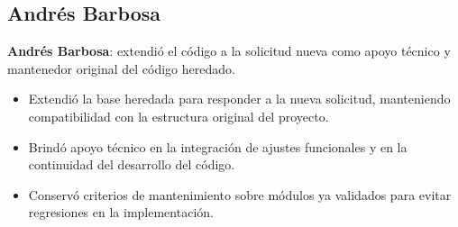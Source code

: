 \subsection{Andrés Barbosa}
\textbf{Andrés Barbosa}: extendió el código a la solicitud nueva como apoyo técnico y mantenedor original del código heredado.
\begin{itemize}
    \item Extendió la base heredada para responder a la nueva solicitud, manteniendo compatibilidad con la estructura original del proyecto.
    \item Brindó apoyo técnico en la integración de ajustes funcionales y en la continuidad del desarrollo del código.
    \item Conservó criterios de mantenimiento sobre módulos ya validados para evitar regresiones en la implementación.
\end{itemize}
